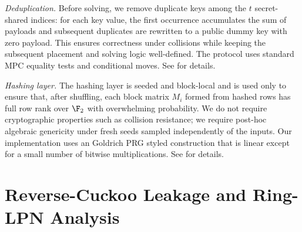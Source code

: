 \emph{Deduplication.}
Before solving, we remove duplicate keys among the $t$ secret-shared indices: for each key value,
the first occurrence accumulates the sum of payloads and subsequent duplicates are rewritten to a
public dummy key with zero payload. This ensures correctness under collisions while keeping the
subsequent placement and solving logic well-defined. The protocol uses standard MPC equality
tests and conditional moves.  See  for details.

\emph{Hashing layer.}
The hashing layer is seeded and block-local and is used only to ensure that, after shuffling, each
block matrix $M_i$ formed from hashed rows has full row rank over $\F_2$ with overwhelming
probability. We do not
require cryptographic properties such as collision resistance; we require post-hoc algebraic
genericity under fresh seeds sampled independently of the inputs. Our implementation uses an
Goldrich PRG styled construction that is linear except for a small number of bitwise multiplications.  See  for details.

\fi


\iffalse
\section{Reverse-Cuckoo Leakage and Ring-LPN Analysis}
\label{sec:revCuckooAnalysis}

